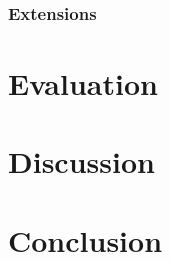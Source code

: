 \documentclass{acm_proc_article-sp}
\begin{document}
\subsubsection{Extensions}

\section{Evaluation}
\label{sec_eval}

\section{Discussion}
\label{sec_discussion}

\section{Conclusion}
\label{sec_conclusion}

{}

\end{document}
